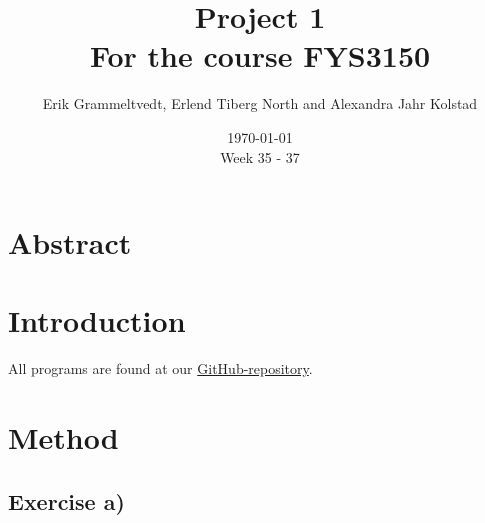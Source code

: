 \documentclass{article}
\begin{document}
\addtocounter{page}{0}

\title{Project 1 \\
      \large For the course FYS3150}
\date{\today \\
    \vspace{1mm}
    \large Week 35 - 37}

\author{Erik Grammeltvedt, Erlend Tiberg North and Alexandra Jahr Kolstad}

\maketitle

\vspace{1cm}

\tableofcontents

\vspace{1cm}



\section{Abstract} \label{sec:Abstract}




\vspace{1cm}

\section{Introduction} \label{sec:Introduction}


All programs are found at our \href{https://github.com/Erikbgram/Fys3150}{GitHub-repository}. \\


\vspace{1cm}

\section{Method} \label{sec:Method}



\subsection{Exercise a)} \label{sec:Method a)}
\end{document}
